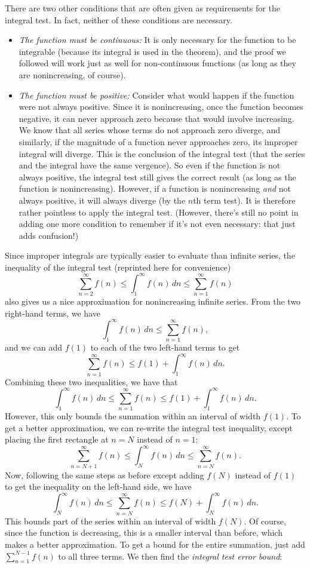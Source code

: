 \documentclass{myarticle}
\theoremstyle{nospace}
\newtheorem{old series theorem}{Theorem}
\newenvironment{series theorem}
{\begin{mdframed}\begin{old series theorem}}
    {\end{old series theorem}\end{mdframed}}
\begin{document}
There are two other conditions that are often given as requirements
for the integral test. In fact, neither of these conditions are
necessary.
\begin{itemize}
\item \emph{The function must be continuous:} It is only necessary for
  the function to be integrable (because its integral is used in the
  theorem), and the proof we followed will work just as well for
  non-continuous functions (as long as they are nonincreasing, of
  course).
\item \emph{The function must be positive:} Consider what would happen
  if the function were not always positive. Since it is nonincreasing,
  once the function becomes negative, it can never approach zero
  because that would involve increasing. We know that all series whose
  terms do not approach zero diverge, and similarly, if the magnitude
  of a function never approaches zero, its improper integral will
  diverge. This is the conclusion of the integral test (that the
  series and the integral have the same vergence). So even if the
  function is not always positive, the integral test still gives the
  correct result (as long as the function is nonincreasing). However,
  if a function is nonincreasing \emph{and} not always positive, it
  will always diverge (by the $n$th term test). It is therefore rather
  pointless to apply the integral test. (However, there's still no
  point in adding one more condition to remember if it's not even
  necessary: that just adds confusion!)
\end{itemize}

Since improper integrals are typically easier to evaluate than
infinite series, the inequality of the integral test (reprinted here
for convenience)
\[
  \sum_{n=2}^\infty f(n)
  \leq \int_1^\infty f(n) \,dn
  \leq \sum_{n=1}^\infty f(n)
\]
also gives us a nice approximation for nonincreasing infinite series.
From the two right-hand terms, we have
\[
  \int_1^\infty f(n) \,dn \leq \sum_{n=1}^\infty f(n),
\]
and we can add $f(1)$ to each of the two left-hand terms to get
\[
  \sum_{n=1}^\infty f(n) \leq f(1) + \int_1^\infty f(n) \,dn.
\]
Combining these two inequalities, we have that
\[
  \int_1^\infty f(n) \,dn
  \leq \sum_{n=1}^\infty f(n)
  \leq f(1) + \int_1^\infty f(n) \,dn.
\]
However, this only bounds the summation within an interval of width
$f(1)$. To get a better approximation, we can re-write the integral
test inequality, except placing the first rectangle at $n = N$ instead
of $n = 1$:
\[
  \sum_{n=N+1}^\infty f(n)
  \leq \int_N^\infty f(n) \,dn
  \leq \sum_{n=N}^\infty f(n).
\]
Now, following the same steps as before except adding $f(N)$ instead
of $f(1)$ to get the inequality on the left-hand side, we have
\[
  \int_N^\infty f(n) \,dn
  \leq \sum_{n=N}^\infty f(n)
  \leq f(N) + \int_N^\infty f(n) \,dn.
\]
This bounds part of the series within an interval of width $f(N)$. Of
course, since the function is decreasing, this is a smaller interval
than before, which makes a better approximation. To get a bound for
the entire summation, just add $\sum_{n=1}^{N-1} f(n)$ to all three
terms. We then find the \emph{integral test error bound}:
\end{document}
